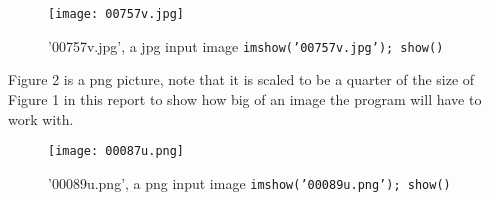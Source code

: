 \documentclass{article}
\begin{document}
\begin{figure*}[h!]
    \texttt{[image: 00757v.jpg]}
    \caption{'00757v.jpg', a jpg input image \texttt{imshow('00757v.jpg'); show()}}
    \label{fig:randim}
\end{figure*}

Figure 2 is a png picture, note that it is scaled to be a quarter of the size of Figure 1 in this report to show how big of an image the program will have to work with.

\begin{figure*}[h!]
    \texttt{[image: 00087u.png]}
    \caption{'00089u.png', a png input image \texttt{imshow('00089u.png'); show()}}
    \label{fig:randim}
\end{figure*}



\clearpage
\end{document}
